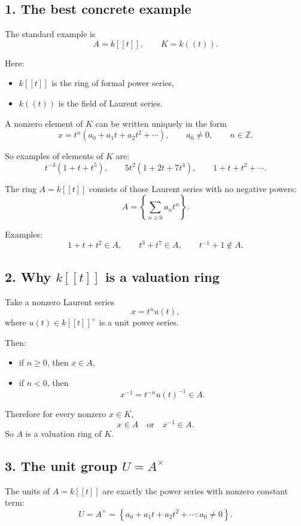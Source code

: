 \documentclass[12pt,a4paper]{article}
\theoremstyle{notespace}
\begin{document}
\subsection{1. The best concrete example}

The standard example is
\[
A=k[[t]],
\qquad
K=k((t)).
\]

Here:
\begin{itemize}
	\item \(k[[t]]\) is the ring of formal power series,
	\item \(k((t))\) is the field of Laurent series.
\end{itemize}

A nonzero element of \(K\) can be written uniquely in the form
\[
x=t^n(a_0+a_1t+a_2t^2+\cdots),
\qquad
a_0\neq 0,
\qquad
n\in \mathbb Z.
\]

So examples of elements of \(K\) are:
\[
t^{-3}(1+t+t^5),
\qquad
5t^2(1+2t+7t^4),
\qquad
1+t+t^2+\cdots.
\]

The ring \(A=k[[t]]\) consists of those Laurent series with no negative powers:
\[
A=\left\{\sum_{n\ge 0} a_n t^n\right\}.
\]

Examples:
\[
1+t+t^2 \in A,
\qquad
t^3+t^7\in A,
\qquad
t^{-1}+1\notin A.
\]

\subsection{2. Why \(k[[t]]\) is a valuation ring}

Take a nonzero Laurent series
\[
x=t^n u(t),
\]
where \(u(t)\in k[[t]]^\times\) is a unit power series.

Then:
\begin{itemize}
	\item if \(n\ge 0\), then \(x\in A\),
	\item if \(n<0\), then
	\[
	x^{-1}=t^{-n}u(t)^{-1}\in A.
	\]
\end{itemize}

Therefore for every nonzero \(x\in K\),
\[
x\in A
\quad \text{or} \quad
x^{-1}\in A.
\]
So \(A\) is a valuation ring of \(K\).

\subsection{3. The unit group \(U=A^\times\)}

The units of \(A=k[[t]]\) are exactly the power series with nonzero constant term:
\[
U=A^\times
=
\left\{
a_0+a_1t+a_2t^2+\cdots : a_0\neq 0
\right\}.
\]
\end{document}
